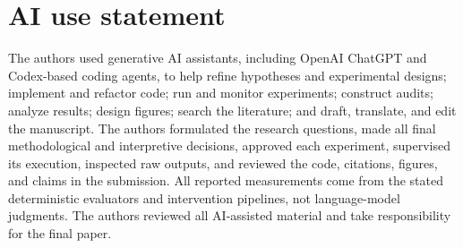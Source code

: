 \section*{AI use statement}

The authors used generative AI assistants, including OpenAI ChatGPT and
Codex-based coding agents, to help refine hypotheses and experimental designs;
implement and refactor code; run and monitor experiments; construct audits;
analyze results; design figures; search the literature; and draft, translate,
and edit the manuscript. The authors formulated the research questions, made
all final methodological and interpretive decisions, approved each experiment,
supervised its execution, inspected raw outputs, and reviewed the
code, citations, figures, and claims in the submission. All reported
measurements come from the stated deterministic evaluators and intervention
pipelines, not language-model judgments. The authors reviewed all AI-assisted
material and take responsibility for the final paper.
